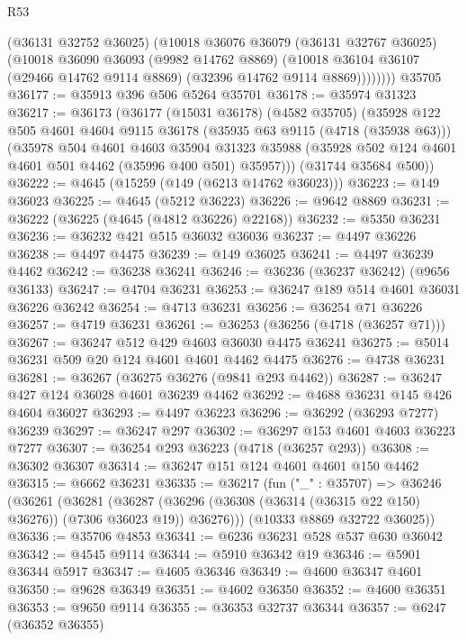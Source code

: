 \begin{lexlean}{R53}
\begin{coremodule}
            (@36131 @32752 @36025)
            (@10018
              @36076
              @36079
              (@36131 @32767 @36025)
              (@10018
                @36090
                @36093
                (@9982 @14762 @8869)
                (@10018 @36104 @36107 (@29466 @14762 @9114 @8869) (@32396 @14762 @9114 @8869))))))))
    @35705
@36177 := @35913 @396 @506 @5264 @35701
@36178 := @35974 @31323
@36217 := @36173
    (@36177
      (@15031 @36178)
      (@4582 @35705)
      (@35928
        @122
        @505
        @4601
        @4604
        @9115
        @36178
        (@35935 @63 @9115 (@4718 (@35938 @63)))
        (@35978
          @504
          @4601
          @4603
          @35904
          @31323
          @35988
          (@35928 @502 @124 @4601 @4601 @501 @4462 (@35996 @400 @501) @35957)))
      (@31744 @35684 @500))
@36222 := @4645 (@15259 (@149 (@6213 @14762 @36023)))
@36223 := @149 @36023
@36225 := @4645 (@5212 @36223)
@36226 := @9642 @8869
@36231 := @36222 (@36225 (@4645 (@4812 @36226) @22168))
@36232 := @5350 @36231
@36236 := @36232 @421 @515 @36032 @36036
@36237 := @4497 @36226
@36238 := @4497 @4475
@36239 := @149 @36025
@36241 := @4497 @36239 @4462
@36242 := @36238 @36241
@36246 := @36236 (@36237 @36242) (@9656 @36133)
@36247 := @4704 @36231
@36253 := @36247 @189 @514 @4601 @36031 @36226 @36242
@36254 := @4713 @36231
@36256 := @36254 @71 @36226
@36257 := @4719 @36231
@36261 := @36253 (@36256 (@4718 (@36257 @71)))
@36267 := @36247 @512 @429 @4603 @36030 @4475 @36241
@36275 := @5014 @36231 @509 @20 @124 @4601 @4601 @4462 @4475
@36276 := @4738 @36231
@36281 := @36267 (@36275 @36276 (@9841 @293 @4462))
@36287 := @36247 @427 @124 @36028 @4601 @36239 @4462
@36292 := @4688 @36231 @145 @426 @4604 @36027
@36293 := @4497 @36223
@36296 := @36292 (@36293 @7277) @36239
@36297 := @36247 @297
@36302 := @36297 @153 @4601 @4603 @36223 @7277
@36307 := @36254 @293 @36223 (@4718 (@36257 @293))
@36308 := @36302 @36307
@36314 := @36247 @151 @124 @4601 @4601 @150 @4462
@36315 := @6662 @36231
@36335 := @36217
    (fun ("_" : @35707) =>
    @36246
      (@36261
        (@36281
          (@36287 (@36296 (@36308 (@36314 (@36315 @22 @150) @36276)) (@7306 @36023 @19)) @36276)))
      (@10333 @8869 @32722 @36025))
@36336 := @35706 @4853
@36341 := @6236 @36231 @528 @537 @630 @36042
@36342 := @4545 @9114
@36344 := @5910 @36342 @19
@36346 := @5901 @36344 @5917
@36347 := @4605 @36346
@36349 := @4600 @36347 @4601
@36350 := @9628 @36349
@36351 := @4602 @36350
@36352 := @4600 @36351
@36353 := @9650 @9114
@36355 := @36353 @32737 @36344
@36357 := @6247 (@36352 @36355)

\end{coremodule}
\end{lexlean}

